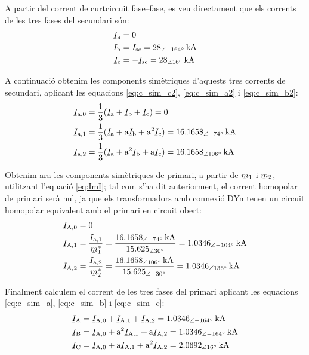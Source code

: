 \begin{exemple}
    \begin{center}
       
    \end{center}

    A partir del corrent de curtcircuit fase--fase, es veu directament que els corrents de les tres fases del secundari són:
    \begin{align*}
        \cmplx{I}\ped{a} &= 0  \\
        \cmplx{I}\ped{b} &= \cmplx{I}\ped{sc} = \SIpd{28}{-164}{kA}  \\
        \cmplx{I}\ped{c} &= -\cmplx{I}\ped{sc} = \SIpd{28}{16}{kA}
    \end{align*}

    A continuació obtenim les components simètriques d'aquests tres corrents de secundari, aplicant les equacions \eqref{eq:c_sim_c2}, \eqref{eq:c_sim_a2} i \eqref{eq:c_sim_b2}:
    \begin{align*}
        \cmplx{I}\ped{a,0} &= \frac{1}{3} (\cmplx{I}\ped{a} + \cmplx{I}\ped{b} +
        \cmplx{I}\ped{c}) = 0 \\
        \cmplx{I}\ped{a,1} &= \frac{1}{3} (\cmplx{I}\ped{a} + \au \cmplx{I}\ped{b} +
         \au^2 \cmplx{I}\ped{c}) = \SIpd{16,1658}{-74}{kA}  \\
        \cmplx{I}\ped{a,2} &= \frac{1}{3} (\cmplx{I}\ped{a} + \au^2 \cmplx{I}\ped{b} +
         \au \cmplx{I}\ped{c}) = \SIpd{16,1658}{106}{kA}
    \end{align*}

    Obtenim ara les components simètriques de primari, a partir de $\cmplx{m}_1$ i $\cmplx{m}_2$, utilitzant l'equació \eqref{eq:ImI}; tal com s'ha dit anteriorment, el corrent homopolar de primari serà nul, ja que els transformadors amb connexió DYn tenen un circuit homopolar equivalent amb el primari en circuit obert:
    \begin{align*}
        \cmplx{I}\ped{A,0} &= 0 \\
        \cmplx{I}\ped{A,1} &= \frac{\cmplx{I}\ped{a,1}}{\cmplx{m}^*_1} = \frac{\SIpd{16,1658}{-74}{kA}}{\numpd{15,625}{30}} =  \SIpd{1,0346}{-104}{kA} \\
        \cmplx{I}\ped{A,2} &= \frac{\cmplx{I}\ped{a,2}}{\cmplx{m}^*_2} = \frac{\SIpd{16,1658}{106}{kA}}{\numpd{15,625}{-30}} = \SIpd{1,0346}{136}{kA}
    \end{align*}

    Finalment calculem el corrent de les tres fases del primari aplicant les equacions \eqref{eq:c_sim_a}, \eqref{eq:c_sim_b} i \eqref{eq:c_sim_c}:
     \begin{align*}
        \cmplx{I}\ped{A} &= \cmplx{I}\ped{A,0} + \cmplx{I}\ped{A,1} + \cmplx{I}\ped{A,2} = \SIpd{1,0346}{-164}{kA} \\
        \cmplx{I}\ped{B} &= \cmplx{I}\ped{A,0} + \au^2 \cmplx{I}\ped{A,1} + \au \cmplx{I}\ped{A,2} = \SIpd{1,0346}{-164}{kA} \\
        \cmplx{I}\ped{C} &= \cmplx{I}\ped{A,0} + \au \cmplx{I}\ped{A,1} + \au^2 \cmplx{I}\ped{A,2} = \SIpd{2,0692}{16}{kA}
    \end{align*}


\end{exemple}
